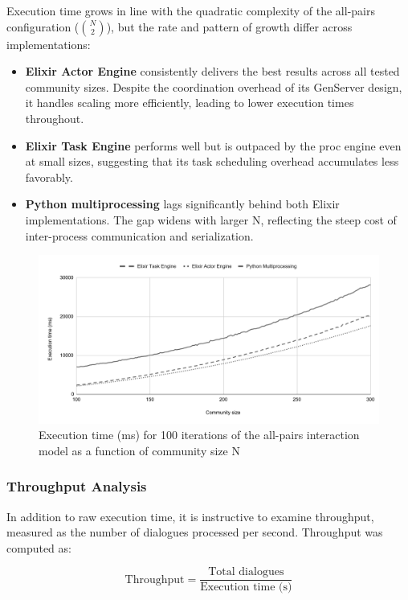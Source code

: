 \documentclass[
]{ceurart}
\begin{document}
Execution time grows in line with the quadratic complexity of the all-pairs configuration ($\binom{N}{2}$), but the rate and pattern of growth differ across implementations:

\begin{itemize}
\item \textbf{Elixir Actor Engine} consistently delivers the best results across all tested community sizes. Despite the coordination overhead of its GenServer design, it handles scaling more efficiently, leading to lower execution times throughout.
\item \textbf{Elixir Task Engine} performs well but is outpaced by the proc engine even at small sizes, suggesting that its task scheduling overhead accumulates less favorably.
\item \textbf{Python multiprocessing} lags significantly behind both Elixir implementations. The gap widens with larger N, reflecting the steep cost of inter-process communication and serialization.
\end{itemize}

\begin{figure}
  \centering
  \includegraphics[width=\linewidth]{images/wall_time_community_100-300.pdf} %
  \caption{Execution time (ms) for 100 iterations of the all-pairs interaction model as a function of community size N}
\end{figure}

\subsubsection{Throughput Analysis}

In addition to raw execution time, it is instructive to examine throughput, measured as the number of dialogues processed per second. Throughput was computed as:

\[\text{Throughput} = \frac{\text{Total dialogues}}{\text{Execution time (s)}}\]
\end{document}
